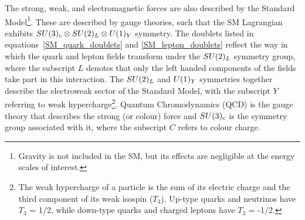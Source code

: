 

The strong, weak, and electromagnetic forces are also described by the Standard Model\footnote{Gravity is not included in the SM, but its effects are negligible at the energy scales of interest.}.
These are described by gauge theories, such that the SM Lagrangian exhibits $SU(3)_c \otimes SU(2)_L \otimes U(1)_Y$ symmetry. The doublets listed in equations~\ref{SM_quark_doublets} and \ref{SM_lepton_doublets} reflect the way in which the quark and lepton fields transform under the $SU(2)_L$ symmetry group, where the subscript $L$ denotes that only the left handed components of the fields take part in this interaction. The $SU(2)_L$ and $U(1)_Y$ symmetries together describe the electroweak sector of the Standard Model, with the subscript $Y$ referring to weak hypercharge\footnote{The weak hypercharge of a particle is the sum of its electric charge and the third component of its weak isospin ($T_3$). Up-type quarks and neutrinos have $T_3$ = 1/2, while down-type quarks and charged leptons have $T_3$ = -1/2.}.  Quantum Chromodynamics (QCD) is the gauge theory that describes the strong (or colour) force and $SU(3)_c$ is the symmetry group associated with it, where the subscript $C$ refers to colour charge.


%
%
%
%
%
%
%
%
%
%
%
%
%
%

